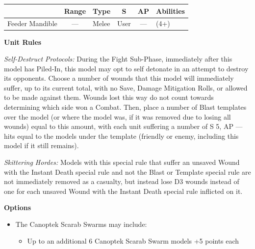 \begin{minipage}[t]{0.72\textwidth}
	\begin{tabular}{L{90 pt} c C{40pt} *{2}{c} >{\raggedright\arraybackslash}p{130pt}}
		& Range & Type & S & AP & Abilities \\
		\hline
		Feeder Mandible & — & Melee & User & — &  (4+) \\
	\end{tabular}

	\vspace*{2em}
	\textbf{Unit Rules}
	
	\textit{Self-Destruct Protocols:} During the Fight Sub-Phase, immediately after this model has Piled-In, this model may opt to self detonate in an attempt to destroy its opponents. Choose a number of wounds that this model will immediately suffer, up to its current total, with no Save, Damage Mitigation Rolls, or  allowed to be made against them. Wounds lost this way do not count towards determining which side won a Combat. Then, place a number of Blast templates over the model (or where the model was, if it was removed due to losing all wounds) equal to this amount, with each unit suffering a number of S 5, AP — hits equal to the models under the template (friendly or enemy, including this model if it still remains).
	
	\textit{Skittering Hordes:} Models with this special rule that suffer an unsaved Wound with the Instant Death special rule and not the Blast or Template special rule are not immediately removed as a casualty, but instead lose D3 wounds instead of one for each unsaved Wound with the Instant Death special rule inflicted on it.

	\vspace*{2em}
	\textbf{Options}
	\begin{itemize}
		\item The Canoptek Scarab Swarms may include:
		\begin{itemize}
			\item Up to an additional 6 Canoptek Scarab Swarm models \dotfill +5 points each
		\end{itemize}
	\end{itemize}
\end{minipage}
\hspace{0.5em}


